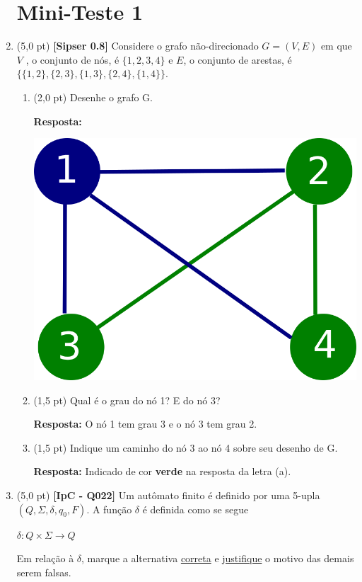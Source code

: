 \documentclass[12pt,a4paper,oneside]{article}
\begin{document}
\begin{enumerate}
	
	\section*{Mini-Teste 1}
	
	\item (5,0 pt) {\bf [Sipser 0.8]} Considere o grafo não-direcionado $G = (V, E)$ em que $V$ , o conjunto de nós, é $\{1, 2, 3, 4\}$ e $E$, o conjunto de arestas, é $\{\{1, 2\}, \{2, 3\}, \{1, 3\}, \{2, 4\}, \{1, 4\}\}$.
	\begin{enumerate}
		\item (2,0 pt) Desenhe o grafo G. 
		
		\vspace*{0.3cm}
		
		{ \color{blue} {\bf Resposta:}
			
			\begin{center}
				\includegraphics[width=.5\textwidth]{imagens/grafo}
			\end{center}
		
		}
	
		\item (1,5 pt) Qual é o grau do nó 1? E do nó 3?  
		
		\vspace*{0.3cm}
		
		{ \color{blue} {\bf Resposta:} O nó 1 tem grau 3 e o nó 3 tem grau 2.}
		\item (1,5 pt) Indique um caminho do nó 3 ao nó 4 sobre seu desenho de G.
		
		\vspace*{0.3cm}
		
		{ \color{blue} {\bf Resposta:} Indicado de cor {\color{green} \bf verde} na resposta da letra (a).}
	\end{enumerate}
	
	\newpage
	
	\item (5,0 pt) {\bf [IpC - Q022]}
	Um autômato finito é definido por uma 5-upla $(Q, \Sigma, \delta, q_0, F)$. A função $\delta$ é definida como se segue
	\begin{center}
		$\delta:Q \times \Sigma \rightarrow Q$
	\end{center}
	Em relação à $\delta$, marque a alternativa \underline{correta} e \underline{justifique} o motivo das demais serem falsas.


\end{enumerate}
\end{document}
